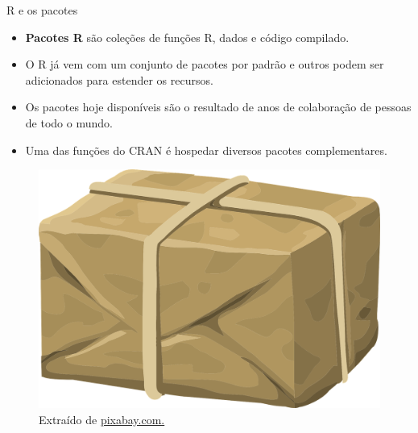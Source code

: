 \documentclass[
  ignorenonframetext,
  serif,
  professionalfont,
  usenames,
  dvipsnames,
  aspectratio = 169]{beamer}
\providecommand{\tightlist}{%
  \setlength{\itemsep}{0pt}\setlength{\parskip}{0pt}}
\renewcommand{\tightlist}{%
  \setlength{\itemsep}{0\baselineskip}
  \setlength{\parskip}{0.25\baselineskip}
}
\def\beginAHalfColumn{\begin{minipage}{0.49\textwidth}}%
\def\endColumns{\end{minipage}}%
\begin{document}
\begin{frame}{R e os pacotes}
\label{r-e-os-pacotes}
\beginAHalfColumn

\begin{itemize}
\tightlist
\item
  \textbf{Pacotes R} são coleções de funções R, dados e código
  compilado.
\end{itemize}

\vspace{0.3cm}

\begin{itemize}
\tightlist
\item
  O R já vem com um conjunto de pacotes por padrão e outros podem ser
  adicionados para estender os recursos.
\end{itemize}

\vspace{0.3cm}

\begin{itemize}
\tightlist
\item
  Os pacotes hoje disponíveis são o resultado de anos de colaboração de
  pessoas de todo o mundo.
\end{itemize}

\vspace{0.3cm}

\begin{itemize}
\tightlist
\item
  Uma das funções do CRAN é hospedar diversos pacotes complementares.
\end{itemize}

\endColumns
\beginAHalfColumn

\begin{figure}

{\centering \includegraphics[width=0.6\linewidth]{./img/pacote} 

}

\caption{Extraído de \href{https://cdn.pixabay.com/photo/2014/12/21/23/35/parcel-575623_960_720.png}{pixabay.com.}}\label{fig:unnamed-chunk-6}
\end{figure}

\endColumns
\end{frame}
\end{document}
